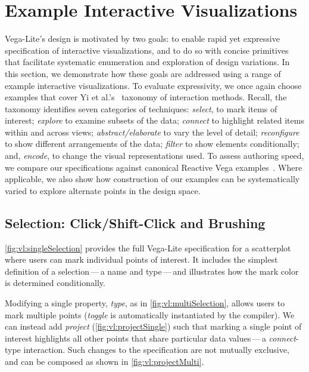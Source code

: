 
\vspace{-10pt}

\section{Example Interactive Visualizations}
\label{sec:vl:examples}

\vspace{-10pt}

Vega-Lite's design is motivated by two goals: to enable rapid yet expressive
specification of interactive visualizations, and to do so with concise
primitives that facilitate systematic enumeration and exploration of design
variations. In this section, we demonstrate how these goals are addressed using
a range of example interactive visualizations. To evaluate expressivity, we once
again choose examples that cover Yi et al.'s~\cite{yi:understanding} taxonomy of
interaction methods. Recall, the taxonomy identifies seven categories of
techniques: \emph{select}, to mark items of interest; \emph{explore} to examine
subsets of the data; \emph{connect} to highlight related items within and across
views; \emph{abstract/elaborate} to vary the level of detail; \emph{reconfigure}
to show different arrangements of the data; \emph{filter} to show elements
conditionally; and, \emph{encode}, to change the visual representations used. To
assess authoring speed, we compare our specifications against canonical Reactive
Vega examples~\cite{reactive-vega-arch, reactive-vega-model, vega:editor}. Where
applicable, we also show how construction of our examples can be systematically
varied to explore alternate points in the design space.

\vspace{-10pt}

\subsection{Selection: Click/Shift-Click and Brushing}

\vspace{-7pt}

\cref{fig:vl:singleSelection} provides the full Vega-Lite specification for a
scatterplot where users can mark individual points of interest. It includes the
simplest definition of a selection\,---\,a name and type\,---\,and illustrates
how the mark color is determined conditionally.

Modifying a single property, \emph{type}, as in \cref{fig:vl:multiSelection},
allows users to mark multiple points (\emph{toggle} is automatically
instantiated by the compiler). We can instead add \emph{project}
(\cref{fig:vl:projectSingle}) such that marking a single point of interest
highlights all other points that share particular data values\,---\,a
\emph{connect}-type interaction. Such changes to the specification are not
mutually exclusive, and can be composed as shown in \cref{fig:vl:projectMulti}.

